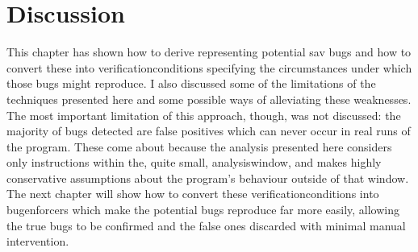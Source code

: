 \section{Discussion}

This chapter has shown how to derive {\StateMachines} representing
potential \gls{sav} bugs and how to convert these into
\glspl{verificationcondition} specifying the circumstances under which
those bugs might reproduce.  I also discussed some of the limitations
of the techniques presented here and some possible ways of alleviating
these weaknesses.  The most important limitation of this approach,
though, was not discussed: the majority of bugs detected are false
positives which can never occur in real runs of the program.  These
come about because the {\StateMachine} analysis presented here
considers only instructions within the, quite small,
\gls{analysiswindow}, and makes highly conservative assumptions about
the program's behaviour outside of that window.  The next chapter will
show how to convert these \glspl{verificationcondition} into
\glspl{bugenforcer} which make the potential bugs reproduce far more
easily, allowing the true bugs to be confirmed and the false ones
discarded with minimal manual intervention.
